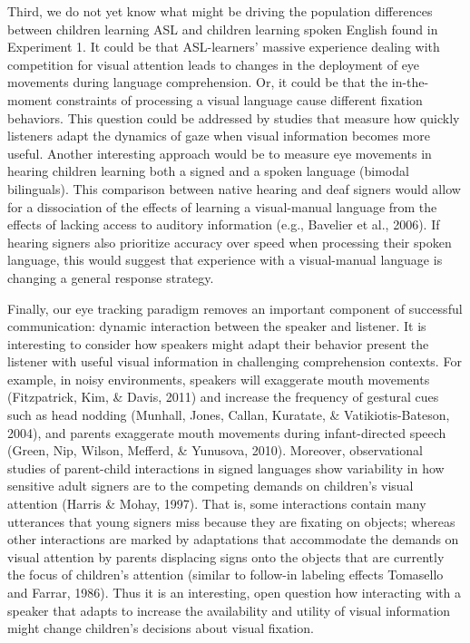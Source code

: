 \documentclass[,man,floatsintext]{apa6}
\begin{document}
Third, we do not yet know what might be driving the population
differences between children learning ASL and children learning spoken
English found in Experiment 1. It could be that ASL-learners' massive
experience dealing with competition for visual attention leads to
changes in the deployment of eye movements during language
comprehension. Or, it could be that the in-the-moment constraints of
processing a visual language cause different fixation behaviors. This
question could be addressed by studies that measure how quickly
listeners adapt the dynamics of gaze when visual information becomes
more useful. Another interesting approach would be to measure eye
movements in hearing children learning both a signed and a spoken
language (bimodal bilinguals). This comparison between native hearing
and deaf signers would allow for a dissociation of the effects of
learning a visual-manual language from the effects of lacking access to
auditory information (e.g., Bavelier et al., 2006). If hearing signers
also prioritize accuracy over speed when processing their spoken
language, this would suggest that experience with a visual-manual
language is changing a general response strategy.

Finally, our eye tracking paradigm removes an important component of
successful communication: dynamic interaction between the speaker and
listener. It is interesting to consider how speakers might adapt their
behavior present the listener with useful visual information in
challenging comprehension contexts. For example, in noisy environments,
speakers will exaggerate mouth movements (Fitzpatrick, Kim, \& Davis,
2011) and increase the frequency of gestural cues such as head nodding
(Munhall, Jones, Callan, Kuratate, \& Vatikiotis-Bateson, 2004), and
parents exaggerate mouth movements during infant-directed speech (Green,
Nip, Wilson, Mefferd, \& Yunusova, 2010). Moreover, observational
studies of parent-child interactions in signed languages show
variability in how sensitive adult signers are to the competing demands
on children's visual attention (Harris \& Mohay, 1997). That is, some
interactions contain many utterances that young signers miss because
they are fixating on objects; whereas other interactions are marked by
adaptations that accommodate the demands on visual attention by parents
displacing signs onto the objects that are currently the focus of
children's attention (similar to follow-in labeling effects Tomasello
and Farrar, 1986). Thus it is an interesting, open question how
interacting with a speaker that adapts to increase the availability and
utility of visual information might change children's decisions about
visual fixation.
\end{document}
